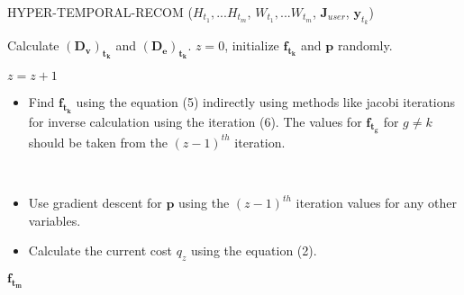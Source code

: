 \documentclass[conference]{IEEEtran}
\begin{document}
\begin{algorithm} %
\caption{HYPER-TEMPORAL-RECOM (${H_{t_1}, ... H_{t_m}}$, ${W_{t_1}, ... W_{t_m}}$, $\mathbf{J}_{user}$, $\mathbf{y}_{t_k}$)} %
\label{alg2} %
\begin{algorithmic} %

\STATE Calculate $\mathbf{(D_v)_{t_k}}$ and $\mathbf{(D_e)_{t_k}}$.
\STATE $z=0$, initialize $\mathbf{f_{t_k}}$ and $\mathbf{p}$ randomly.

\REPEAT
\STATE $z=z+1$


\begin{itemize}
\item{Find $\mathbf{f_{t_k}}$ using the equation (5) indirectly using methods like jacobi iterations for inverse calculation using the iteration (6). The values for $\mathbf{f_{t_g}}$ for $g \neq k$ should be taken from the $(z-1)^{th}$ iteration.}
\end{itemize}

\ENDFOR \\

\begin{itemize}
\item{Use gradient descent for $\mathbf{p}$ using the $(z-1)^{th}$ iteration values for any other variables.}
\item{Calculate the current cost $q_z$ using the equation (2).}
\end{itemize}


\RETURN $\mathbf{f_{t_m}}$

\end{algorithmic}
\end{algorithm}
\end{document}
